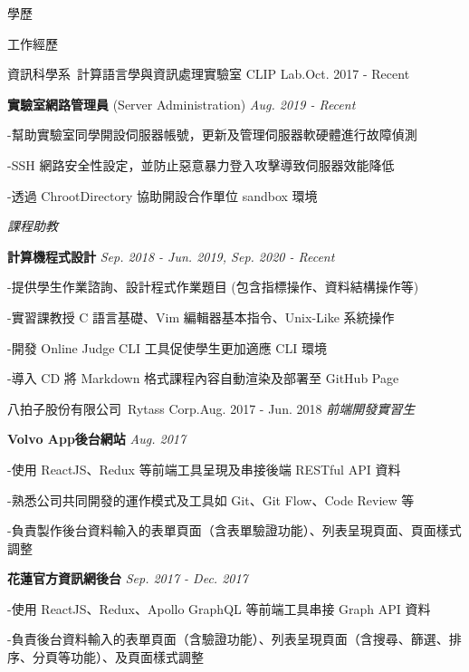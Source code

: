 \documentclass{resume} %
\begin{document}
\begin{rSection}{\Large 學歷}
\begin{rSection}{\Large 工作經歷}
\begin{rSubsection}{\large 資訊科學系\ 計算語言學與資訊處理實驗室 CLIP Lab.}{Oct. 2017 - Recent}
\medskip
\item {\bf 實驗室網路管理員} {\small (Server Administration)}  {\it  Aug. 2019 - Recent}

{\quad \small -幫助實驗室同學開設伺服器帳號，更新及管理伺服器軟硬體進行故障偵測}

{\quad \small -SSH 網路安全性設定，並防止惡意暴力登入攻擊導致伺服器效能降低}

{\quad \small -透過 ChrootDirectory 協助開設合作單位 sandbox 環境}

\medskip
\end{rSubsection}

\begin{rSubsection}{}{}
{\it{課程助教}}{}
\item \rm {\bf 計算機程式設計}  {\it  Sep. 2018 - Jun. 2019, Sep. 2020 - Recent}

{\quad \small -提供學生作業諮詢、設計程式作業題目 (包含指標操作、資料結構操作等)}

{\quad \small -實習課教授 C 語言基礎、Vim 編輯器基本指令、Unix-Like 系統操作}

{\quad \small -開發 Online Judge CLI 工具促使學生更加適應 CLI 環境}

{\quad \small -導入 CD 將 Markdown 格式課程內容自動渲染及部署至 GitHub Page}

\medskip
%

\end{rSubsection} 


\begin{rSubsection}{\large 八拍子股份有限公司\ Rytass Corp.}{Aug. 2017 - Jun. 2018} 
{\it{前端開發實習生}}{}
\item \rm {\bf {\small Volvo App}後台網站}  {\it  Aug. 2017}

{\quad \small -使用 ReactJS、Redux 等前端工具呈現及串接後端 RESTful API 資料}

{\quad \small -熟悉公司共同開發的運作模式及工具如 Git、Git Flow、Code Review 等}

{\quad \small -負責製作後台資料輸入的表單頁面（含表單驗證功能）、列表呈現頁面、頁面樣式調整}

\medskip
\item {\bf 花蓮官方資訊網後台}  {\it  Sep. 2017 - Dec. 2017}

{\quad \small -使用 ReactJS、Redux、Apollo GraphQL 等前端工具串接 Graph API 資料}

{\quad \small -負責後台資料輸入的表單頁面（含驗證功能）、列表呈現頁面（含搜尋、篩選、排序、分頁等功能）、及頁面樣式調整}


\end{rSubsection}
\end{rSection}
\end{rSection}
\end{document}
